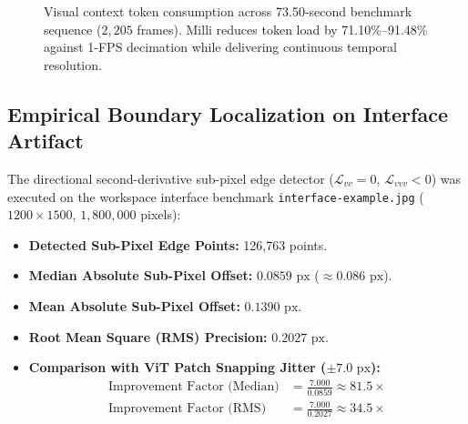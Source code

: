 \documentclass[11pt]{article}
\begin{document}
\begin{figure}[t]
\centering
{}
\caption{Visual context token consumption across 73.50-second benchmark sequence ($2,205$ frames). Milli reduces token load by 71.10\%--91.48\% against 1-FPS decimation while delivering continuous temporal resolution.}
\label{fig:token_chart}
\end{figure}

\subsection{Empirical Boundary Localization on Interface Artifact}

The directional second-derivative sub-pixel edge detector ($\mathcal{L}_{vv} = 0$, $\mathcal{L}_{vvv} < 0$) was executed on the workspace interface benchmark \texttt{interface-example.jpg} ($1200 \times 1500$, $1,800,000$ pixels):
\begin{itemize}
    \item \textbf{Detected Sub-Pixel Edge Points:} 126,763 points.
    \item \textbf{Median Absolute Sub-Pixel Offset:} \textbf{$0.0859\text{ px}$} ($\approx 0.086\text{ px}$).
    \item \textbf{Mean Absolute Sub-Pixel Offset:} \textbf{$0.1390\text{ px}$}.
    \item \textbf{Root Mean Square (RMS) Precision:} \textbf{$0.2027\text{ px}$}.
    \item \textbf{Comparison with ViT Patch Snapping Jitter ($\pm 7.0\text{ px}$):}
    \begin{align}
    \text{Improvement Factor (Median)} &= \frac{7.000}{0.0859} \approx \mathbf{81.5\times} \\
    \text{Improvement Factor (RMS)} &= \frac{7.000}{0.2027} \approx \mathbf{34.5\times}
    \end{align}
\end{itemize}
\end{document}

